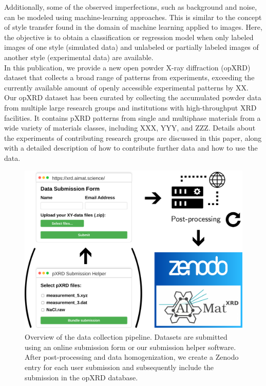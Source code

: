 Additionally, some of the observed imperfections, such as background and noise, can be modeled using machine-learning approaches. This is similar to the concept of style transfer\cite{Gatys2016, Ganin2015} found in the domain of machine learning applied to images. Here, the objective is to obtain a classification or regression model when only labeled images of one style (simulated data) and unlabeled or partially labeled images of another style (experimental data) are available. \\

In this publication, we provide a new open powder X-ray diffraction (opXRD) dataset that collects a broad range of patterns from experiments, exceeding the currently available amount of openly accessible experimental patterns by XX.
Our opXRD dataset has been curated by collecting the accumulated powder data from multiple large research groups and institutions with high-throughput XRD facilities. It contains pXRD patterns from single and multiphase materials from a wide variety of materials classes, including XXX, YYY, and ZZZ. Details about the experiments of contributing research groups are discussed in this paper, along with a detailed description of how to contribute further data and how to use the data. \\

\begin{figure}[!htb]
    \centering
    \includegraphics[width=\linewidth]{figures/overview2.png}
    \caption{Overview of the data collection pipeline. Datasets are submitted using an online submission form or our submission helper software. After post-processing and data homogenization, we create a Zenodo entry for each user submission and subsequently include the submission in the opXRD database.}
    \label{fig:overview}
\end{figure}

